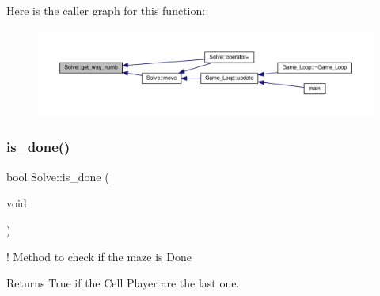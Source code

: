 Here is the caller graph for this function\+:\nopagebreak
\begin{figure}[H]
\begin{center}
\leavevmode
\includegraphics[width=350pt]{classSolve_aaccff68d3e175f7400a9407077db7255_icgraph}
\end{center}
\end{figure}
\mbox{\label{classSolve_a868db181d288fdb10e5592b62e669c3b}} 
\subsubsection{\texorpdfstring{is\+\_\+done()}{is\_done()}}
{\footnotesize\ttfamily bool Solve\+::is\+\_\+done (\begin{DoxyParamCaption}\item[{void}]{ }\end{DoxyParamCaption})}



! Method to check if the maze is Done 

\begin{DoxyReturn}{Returns}
True if the Cell Player are the last one. 
\end{DoxyReturn}

